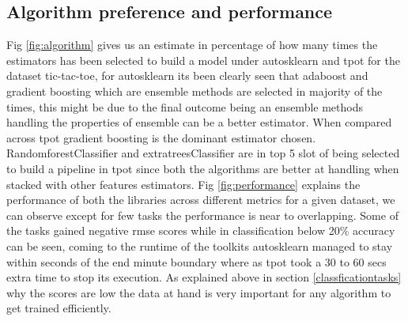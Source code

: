 \subsection{Algorithm preference and performance}
Fig \ref{fig:algorithm} gives us an estimate in percentage of how many times the estimators has been selected to build a model under autosklearn and tpot for the dataset tic-tac-toe, for autosklearn its been clearly seen that adaboost and gradient boosting which are ensemble methods are selected in majority of the times, this might be due to the final outcome being an ensemble methods handling the properties of ensemble can be a better estimator. When compared across tpot gradient boosting is the dominant estimator chosen. RandomforestClassifier and extratreesClassifier are in top 5 slot of being selected to build a pipeline in tpot since both the algorithms are better at handling when stacked with other features estimators. Fig \ref{fig:performance} explains the performance of both the libraries across different metrics for a given dataset, we can observe except for few tasks the performance is near to overlapping. Some of the tasks gained negative rmse scores while in classification below 20\% accuracy can be seen, coming to the runtime of the toolkits autosklearn managed to stay within seconds of the end minute boundary where as tpot took a 30 to 60 secs extra time to stop its execution. As explained above in section \ref{classficationtasks} why the scores are low the data at hand is very important for any algorithm to get trained efficiently.



